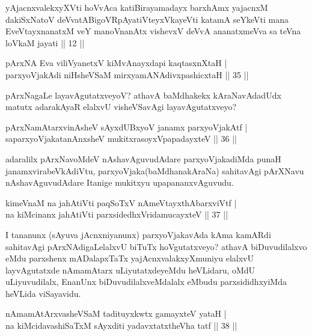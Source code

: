 
\begin{kandikeshl}
yAjacnxvalekxyXVti hoVvAca katiBirayamadayx barxhAmx yajacnxM dakiSxNatoV deVvatABigoVRpAyatiVteyxVkayeVti katamA seYkeVti mana EveVtayxnanatxM veY manoV\s nanAtx vishevxV deVvA ananatxmeVva sa teVna loVkaM jayati || 12 ||
\end{kandikeshl}


\begin{shl}
pArxNA Eva viliVyanetxV kiMvA\s nayxdapi kaqtasxnXtaH |\\
parxyoVjakAdi niHsheVSaM mirxyamANAdivxpashicxtaH \hfill || 35 ||
\end{shl}

\begin{artha}
pArxNagaLe layavAgutatxveyoV? athavA baMdhakekx kAraNavAdadUdx matutx adarakAyaR elalxvU 
visheVSavAgi layavAgutatxveyo?
\end{artha}

\begin{shl}
pArxNamAtarxvinAsheV sAyxdUBxyoV janamx parxyoVjakAtf |\\
saparxyoVjakatanAnxsheV mukitxrasoyxVpapadayxteV \hfill || 36 ||
\end{shl}

\begin{artha}
adaralilx pArxNavoMdeV nAshavAguvudAdare parxyoVjakadiMda punaH janamxvirabeVkAdiVtu, parxyoVjaka(baMdhanakAraNa) sahitavAgi pArXNavu nAshavAguvudAdare Itanige mukitxyu upapananx\-\break vAguvudu.
\end{artha}

\begin{shl}
kimeVnaM na ja{\null}hAtiVti paqSoTxV nAmeVtayxthAbarxviVtf |\\
na kiMcinanx ja{\null}hAtiVti parxsidedhxVridamucayxteV \hfill || 37 ||
\end{shl}

\begin{artha}
I tananunx (sAyuva jAcnxniyanunx) parxyoVjakavAda kAma kamARdi sahitavAgi pArxNAdigaLelalxvU biTuTx hoVgutatxveyo? athavA biDuvudilalxvo eMdu parxshenx mADalapxTaTx yajAcnxvalakxyX\break muniyu elalxvU layvAgutatxde nAmamAtarx uLiyutatxdeyeMdu heVLidaru, oMdU uLiyuvudilalx, EnanUnx biDuvudilalxveMdalalx eMbudu parxsididhxyiMda heVLida viSayavidu.
\end{artha}

\begin{shl}
nAmamAtArxvasheVSaM tadituyxkwtx gamayxteV yataH |\\
na kiMcidavashiSaTxM sAyxditi yadavxtatxtheVha tatf \hfill || 38 ||
\end{shl}

